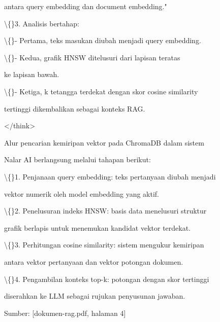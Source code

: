 \documentclass[12pt,a4paper]{article}
\begin{document}
antara query embedding dan document embedding."



\textbackslash\{\}3. Analisis bertahap:



\textbackslash\{\}- Pertama, teks masukan diubah menjadi query embedding.



\textbackslash\{\}- Kedua, grafik HNSW ditelusuri dari lapisan teratas



ke lapisan bawah.



\textbackslash\{\}- Ketiga, k tetangga terdekat dengan skor cosine similarity



tertinggi dikembalikan sebagai konteks RAG.



\textless{}/think\textgreater{}



Alur pencarian kemiripan vektor pada ChromaDB dalam sistem



Nalar AI berlangsung melalui tahapan berikut:



\textbackslash\{\}1. Penjanaan query embedding: teks pertanyaan diubah menjadi



vektor numerik oleh model embedding yang aktif.



\textbackslash\{\}2. Penelusuran indeks HNSW: basis data menelusuri struktur



grafik berlapis untuk menemukan kandidat vektor terdekat.



\textbackslash\{\}3. Perhitungan cosine similarity: sistem mengukur kemiripan



antara vektor pertanyaan dan vektor potongan dokumen.



\textbackslash\{\}4. Pengambilan konteks top-k: potongan dengan skor tertinggi



diserahkan ke LLM sebagai rujukan penyusunan jawaban.



Sumber: {[}dokumen-rag.pdf, halaman 4{]}
\end{document}
